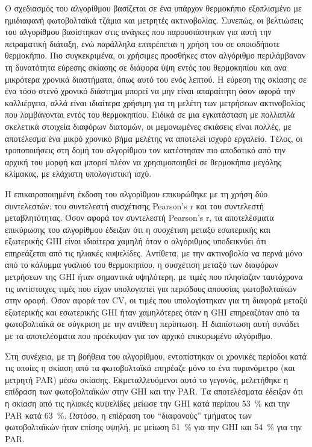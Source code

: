 \documentclass[12pt, a4paper]{report} %
\newcommand{\english}{\foreignlanguage{english}}
\begin{document}
Ο σχεδιασμός του αλγορίθμου βασίζεται σε ένα υπάρχον θερμοκήπιο εξοπλισμένο με ημιδιαφανή φωτοβολταϊκά τζάμια και μετρητές 
ακτινοβολίας. Συνεπώς, οι βελτιώσεις του αλγορίθμου βασίστηκαν στις ανάγκες που παρουσιάστηκαν για αυτή την πειραματική διάταξη, 
ενώ παράλληλα επιτρέπεται η χρήση του σε οποιοδήποτε θερμοκήπιο. Πιο συγκεκριμένα, οι χρήσιμες προσθήκες στον αλγόριθμο 
περιλάμβαναν τη δυνατότητα εύρεσης σκίασης σε διάφορα ύψη εντός του θερμοκηπίου και ανα μικρότερα χρονικά διαστήματα, όπως αυτό 
του ενός λεπτού. Η εύρεση της σκίασης σε ένα τόσο στενό χρονικό διάστημα μπορεί να μην είναι απαραίτητη όσον αφορά την 
καλλιέργεια, αλλά είναι ιδιαίτερα χρήσιμη για τη μελέτη των μετρήσεων ακτινοβολίας που λαμβάνονται εντός του θερμοκηπίου. 
Ειδικά σε μια εγκατάσταση με πολλαπλά σκελετικά στοιχεία διαφόρων διατομών, οι μεμονωμένες σκιάσεις είναι πολλές, με αποτέλεσμα 
ένα μικρό χρονικό βήμα μελέτης να αποτελεί ισχυρό εργαλείο. Τέλος, οι τροποποιήσεις στη δομή του αλγορίθμου τον κατέστησαν 
πιο αποδοτικό από την αρχική του μορφή και μπορεί πλέον να χρησιμοποιηθεί σε θερμοκήπια μεγάλης κλίμακας, με ελάχιστη 
υπολογιστική ισχύ.

Η επικαιροποιημένη έκδοση του αλγορίθμου επικυρώθηκε με τη χρήση δύο συντελεστών: του συντελεστή συσχέτισης \english{Pearson’s r} 
και του συντελεστή μεταβλητότητας. Όσον αφορά τον συντελεστή \english{Pearson’s r}, τα αποτελέσματα επικύρωσης του αλγορίθμου 
έδειξαν ότι η συσχέτιση μεταξύ εσωτερικής και εξωτερικής \english{GHI} είναι ιδιαίτερα χαμηλή όταν ο αλγόριθμος υποδεικνύει 
ότι επηρεάζεται από τις ηλιακές κυψελίδες. Αντίθετα, με την ακτινοβολία να περνά μόνο από το κάλυμμα γυαλιού του θερμοκηπίου, 
η συσχέτιση μεταξύ των διαφόρων μετρήσεων της \english{GHI} ήταν σημαντικά υψηλότερη, με τιμές που πλησίαζαν ταυτόχρονα τις 
αντίστοιχες τιμές που είχαν υπολογιστεί για περιόδους απουσίας φωτοβολταϊκών στην οροφή. Όσον αφορά τον \english{CV}, οι τιμές 
που υπολογίστηκαν για τη διαφορά μεταξύ εξωτερικής και εσωτερικής \english{GHI} ήταν χαμηλότερες όταν η \english{GHI} επηρεαζόταν 
από τα φωτοβολταϊκά σε σύγκριση με την αντίθετη περίπτωση. Η διαπίστωση αυτή συνάδει με τα αποτελέσματα που προέκυψαν για τον 
αρχικό επικυρωμένο αλγόριθμο.

Στη συνέχεια, με τη βοήθεια του αλγορίθμου, εντοπίστηκαν οι χρονικές περίοδοι κατά τις οποίες η σκίαση από τα φωτοβολταϊκά 
επηρέαζε μόνο το ένα πυρανόμετρο (και μετρητή \english{PAR}) μέσω σκίασης. Εκμεταλλευόμενοι αυτό το γεγονός, μελετήθηκε η 
επίδραση των φωτοβολταϊκών στην \english{GHI} και την \english{PAR}. Τα αποτελέσματα έδειξαν ότι η σκίαση από τις ηλιακές 
κυψελίδες μείωσε την \english{GHI} κατά περίπου \SI{53}{\percent} και την \english{PAR} κατά \SI{63}{\percent}. Ωστόσο, η 
επίδραση του “διαφανούς” τμήματος των φωτοβολταϊκών ήταν επίσης υψηλή, με μείωση \SI{51}{\percent} για την \english{GHI} και 
\SI{54}{\percent} για την \english{PAR}.
\end{document}
